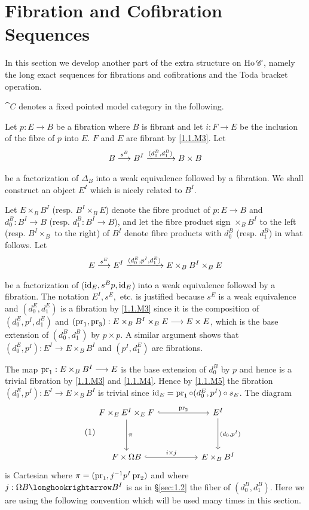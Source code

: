 \documentclass[../main]{subfiles}
\begin{document}
\section{Fibration and Cofibration Sequences}\label{sec:1.3}

In this section we develop another part of the extra structure on $\operatorname{Ho} \mathscr{C}$, namely the long exact sequences for fibrations and cofibrations and the Toda bracket operation.

$\cat{C}$ denotes a fixed pointed model category in the following.

Let $p:E \longrightarrow B$ be a fibration where $B$ is fibrant and let $i:F \longrightarrow E$ be the inclusion of the fibre of $p$ into $E$.  $F$ and $E$ are fibrant by \ref{1.1.M3}.  Let \[ B \varrightarrow{s^B} B^I \varrightarrow{(d_0^B,d_1^B)} B \times B \] be a factorization of $\Delta_B$ into a weak equivalence followed by a fibration.  We shall construct an object $E^I$ which is nicely related to $B^I$.

Let $E \times_B B^I$ (resp. $B^I \times_B E$) denote the fibre product of $p:E \longrightarrow B$ and $d^B_0:B^I \longrightarrow B$ (resp. $d_1^B:B^I \longrightarrow B$), and let the fibre product sign $\times_B B^I$ to the left (resp. $B^I \times_B$ to the right) of $B^I$ denote fibre products with $d_0^B$ (resp. $d_1^B$) in what follows.  Let \[E \varrightarrow{s^E} E^I \varrightarrow{(d_0^E,p^I,d_1^E)} E \times_B B^I \times_B E\] be a factorization of ($\operatorname{id}_E, s^B p, \operatorname{id}_E$) into a weak equivalence followed by a fibration.  The notation $E^I, s^E,$ etc. is justified because $s^E$ is a weak equivalence and $(d_0^E, d_1^E)$ is a fibration by \ref{1.1.M3} since it is the composition of $(d_0^E, p^I, d_1^E)$ and $(\operatorname{pr}_1, \operatorname{pr}_3) : E \times_B B^I \times_B E \longrightarrow E \times E$, which is the base extension of $(d_0^B,d_1^B)$ by $p \times p$.  A similar argument shows that $(d_0^E,p^I):E^I \longrightarrow E \times_B B^I$ and $(p^I,d_1^E)$ are fibrations.

The map $\operatorname{pr}_1:E \times_B B^I \longrightarrow E$ is the base extension of $d_0^B$ by $p$ and hence is a trivial fibration by \ref{1.1.M3} and \ref{1.1.M4}.  Hence by \ref{1.1.M5} the fibration\\ $(d_0^E,p^I):E^I \longrightarrow E \times_B B^I$ is trivial since $\operatorname{id}_E = \operatorname{pr}_1 \circ (d_0^E,p^I) \circ s_E$.  The diagram
\[\tag{1}\label{diag:1.3.1}\begin{tikzcd}
    F \times_E E^I \times_E F && E^I \\ \\
    F \times \Omega B && E \times_B B^I
    \arrow["\pi", from=1-1, to=3-1]
    \arrow["{(d_0, p^I)}", from=1-3, to=3-3]
    \arrow["\pr_2", hookrightarrow, from=1-1, to=1-3]
    \arrow["i \times j", hookrightarrow, from=3-1, to=3-3]
\end{tikzcd}\]
is Cartesian where $\pi = (\operatorname{pr}_1, j^{-1}p^I\operatorname{pr}_2)$ and where $j:\Omega B \longhookrightarrow B^I$ is as in \S\ref{sec:1.2} the fiber of $(d_0^B,d_1^B)$.  Here we are using the following convention which will be used many times in this section.
\end{document}

